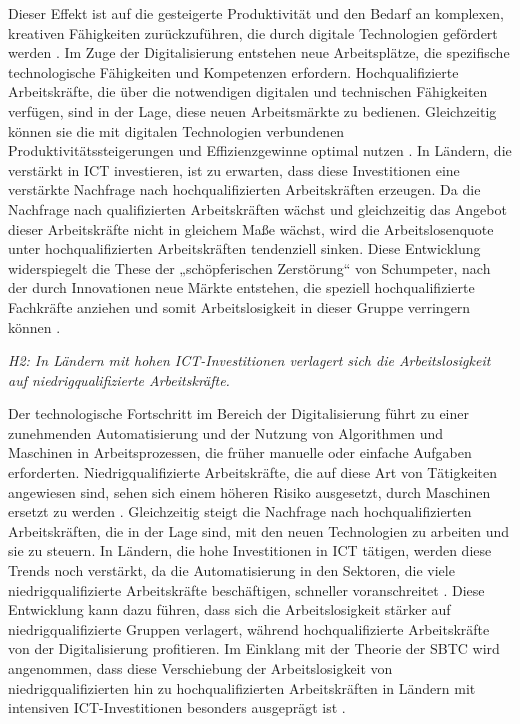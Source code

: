 Dieser Effekt ist auf die gesteigerte Produktivität und den Bedarf an komplexen, kreativen 
Fähigkeiten zurückzuführen, die durch digitale Technologien gefördert werden 
\parencite[vgl.][S. 5–8]{acemoglu2002technical}. Im Zuge der Digitalisierung entstehen neue 
Arbeitsplätze, die spezifische technologische Fähigkeiten und Kompetenzen erfordern. 
Hochqualifizierte Arbeitskräfte, die über die notwendigen digitalen und technischen Fähigkeiten 
verfügen, sind in der Lage, diese neuen Arbeitsmärkte zu bedienen. Gleichzeitig können sie die mit 
digitalen Technologien verbundenen Produktivitätssteigerungen und Effizienzgewinne optimal nutzen 
\parencite[vgl.][Kap. 2]{brynjolfsson2014thesecond}. In Ländern, die verstärkt in \ac{ICT} 
investieren, ist zu erwarten, dass diese Investitionen eine verstärkte Nachfrage nach 
hochqualifizierten Arbeitskräften erzeugen. Da die Nachfrage nach qualifizierten Arbeitskräften 
wächst und gleichzeitig das Angebot dieser Arbeitskräfte nicht in gleichem Maße wächst, wird die 
Arbeitslosenquote unter hochqualifizierten Arbeitskräften tendenziell sinken. Diese 
Entwicklung widerspiegelt die These der „schöpferischen Zerstörung“ von Schumpeter, nach der 
durch Innovationen neue Märkte entstehen, die speziell hochqualifizierte Fachkräfte anziehen 
und somit Arbeitslosigkeit in dieser Gruppe verringern können 
\parencite[vgl.][S. 103–106]{schumpeter1976capitalism}.

\textit{H2: In Ländern mit hohen \ac{ICT}-Investitionen verlagert sich die Arbeitslosigkeit 
auf niedrigqualifizierte Arbeitskräfte.}

Der technologische Fortschritt im Bereich der Digitalisierung führt zu einer zunehmenden 
Automatisierung und der Nutzung von Algorithmen und Maschinen in Arbeitsprozessen, die früher 
manuelle oder einfache Aufgaben erforderten. Niedrigqualifizierte Arbeitskräfte, die auf 
diese Art von Tätigkeiten angewiesen sind, sehen sich einem höheren Risiko ausgesetzt, durch 
Maschinen ersetzt zu werden \parencite[vgl.][S. 5–10]{autor2015whyare}. Gleichzeitig steigt die 
Nachfrage nach hochqualifizierten Arbeitskräften, die in der Lage sind, mit den neuen Technologien 
zu arbeiten und sie zu steuern. In Ländern, die hohe Investitionen in \ac{ICT} tätigen, werden 
diese Trends noch verstärkt, da die Automatisierung in den Sektoren, die viele 
niedrigqualifizierte Arbeitskräfte beschäftigen, schneller voranschreitet 
\parencite[vgl.][S. 254]{frey2013thefuture}. Diese Entwicklung kann dazu führen, dass sich die 
Arbeitslosigkeit stärker auf niedrigqualifizierte Gruppen verlagert, während 
hochqualifizierte Arbeitskräfte von der Digitalisierung profitieren. Im Einklang mit der 
Theorie der \ac{SBTC} wird angenommen, dass diese Verschiebung der Arbeitslosigkeit von 
niedrigqualifizierten hin zu hochqualifizierten Arbeitskräften in Ländern mit intensiven 
\ac{ICT}-Investitionen besonders ausgeprägt ist \parencite[vgl.][S. 3]{acemoglu2019robots}.

